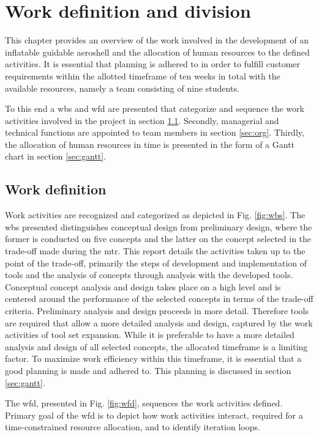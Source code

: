 \section{Work definition and division}
\label{ch:wdd}
This chapter provides an overview of the work involved in the development of an inflatable guidable aeroshell and the allocation of human resources to the defined activities. It is essential that planning is adhered to in order to fulfill customer requirements within the allotted timeframe of ten weeks in total with the available resources, namely a team consisting of nine students. 

To this end a \gls{wbs} and \gls{wfd} are presented that categorize and sequence the work activities involved in the project in section \ref{sec:work}. Secondly, managerial and technical functions are appointed to team members in section \ref{sec:org}. Thirdly, the allocation of human resources in time is presented in the form of a Gantt chart in section \ref{sec:gantt}.

\subsection{Work definition}
\label{sec:work}
Work activities are recognized and categorized as depicted in Fig. \ref{fig:wbs}. The \gls{wbs} presented distinguishes conceptual design from preliminary design, where the former is conducted on five concepts and the latter on the concept selected in the trade-off made during the \acrfull{mtr}. This report details the activities taken up to the point of the trade-off, primarily the steps of development and implementation of tools and the analysis of concepts through analysis with the developed tools. Conceptual concept analysis and design takes place on a high level and is centered around the performance of the selected concepts in terms of the trade-off criteria. Preliminary analysis and design proceeds in more detail. Therefore tools are required that allow a more detailed analysis and design, captured by the work activities of tool set expansion. While it is preferable to have a more detailed analysis and design of all selected concepts, the allocated timeframe is a limiting factor. To maximize work efficiency within this timeframe, it is essential that a good planning is made and adhered to. This planning is discussed in section \ref{sec:gantt}.

The \gls{wfd}, presented in Fig. \ref{fig:wfd}, sequences the work activities defined. Primary goal of the \gls{wfd} is to depict how work activities interact, required for a time-constrained resource allocation, and to identify iteration loops.

